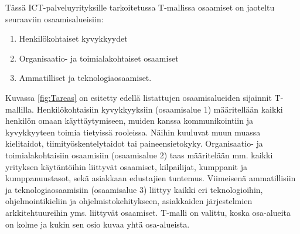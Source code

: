 \documentclass[a4paper,finnish,12pt]{article}
\begin{document}
Tässä ICT-palveluyrityksille tarkoitetussa T-mallissa osaamiset on jaoteltu seuraaviin osaamisalueisiin: \begin{enumerate}
	\item Henkilökohtaiset kyvykkyydet
	\item Organisaatio- ja toimialakohtaiset osaamiset
	\item Ammatilliset ja teknologiaosaamiset.
\end{enumerate} Kuvassa \ref{fig:Tareas} on esitetty edellä listattujen osaamisalueiden sijainnit T-mallilla. Henkilökohtaisiin kyvykkyyksiin (osaamisalue 1) määritellään kaikki henkilön omaan käyttäytymiseen, muiden kanssa kommunikointiin ja kyvykkyyteen toimia tietyissä rooleissa. Näihin kuuluvat muun muassa kielitaidot, tiimityöskentelytaidot tai paineensietokyky. Organisaatio- ja toimialakohtaisiin osaamisiin (osaamisalue 2) taas määritelään mm. kaikki yrityksen käytäntöihin liittyvät osaamiset, kilpailijat, kumppanit ja kumppanuustasot, sekä asiakkaan edustajien tuntemus. Viimeisenä ammatillisiin ja teknologiaosaamisiin (osaamisalue 3) liittyy kaikki eri teknologioihin, ohjelmointikieliin ja ohjelmistokehitykseen, asiakkaiden järjestelmien arkkitehtuureihin yms. liittyvät osaamiset. T-malli on valittu, koska osa-alueita on kolme ja kukin sen osio kuvaa yhtä osa-alueista.
\end{document}
